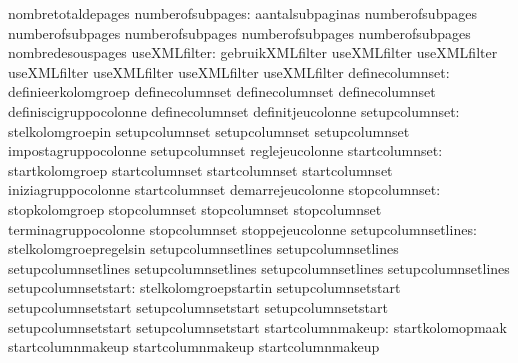                                   nombretotaldepages
                numberofsubpages: aantalsubpaginas                 numberofsubpages
                                  numberofsubpages                 numberofsubpages
                                  numberofsubpages                 numberofsubpages
                                  nombredesouspages
                    useXMLfilter: gebruikXMLfilter                 useXMLfilter
                                  useXMLfilter                     useXMLfilter
                                  useXMLfilter                     useXMLfilter
                                  useXMLfilter
                 definecolumnset: definieerkolomgroep              definecolumnset
                                  definecolumnset                  definecolumnset
                                  definiscigruppocolonne           definecolumnset
                                  definitjeucolonne
                  setupcolumnset: stelkolomgroepin                 setupcolumnset
                                  setupcolumnset                   setupcolumnset
                                  impostagruppocolonne             setupcolumnset
                                  reglejeucolonne
                  startcolumnset: startkolomgroep                  startcolumnset
                                  startcolumnset                   startcolumnset
                                  iniziagruppocolonne              startcolumnset
                                  demarrejeucolonne
                   stopcolumnset: stopkolomgroep                   stopcolumnset
                                  stopcolumnset                    stopcolumnset
                                  terminagruppocolonne             stopcolumnset
                                  stoppejeucolonne
             setupcolumnsetlines: stelkolomgroepregelsin           setupcolumnsetlines
                                  setupcolumnsetlines              setupcolumnsetlines
                                  setupcolumnsetlines              setupcolumnsetlines
                                  setupcolumnsetlines
             setupcolumnsetstart: stelkolomgroepstartin            setupcolumnsetstart
                                  setupcolumnsetstart              setupcolumnsetstart
                                  setupcolumnsetstart              setupcolumnsetstart
                                  setupcolumnsetstart
               startcolumnmakeup: startkolomopmaak                 startcolumnmakeup
                                  startcolumnmakeup                startcolumnmakeup
